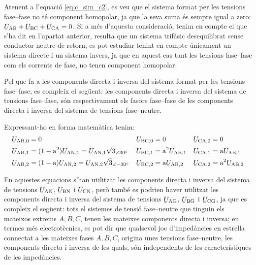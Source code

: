 Atenent a l'equació \eqref{eq:c_sim_c2}, es veu que el sistema
format per les tensions fase--fase no té component homopolar, ja que
la seva suma  és sempre igual a zero: $\cmplx{U}\ped{AB} +
\cmplx{U}\ped{BC} + \cmplx{U}\ped{CA} = 0$. Si a més
d'aquesta consideració, tenim en compte el que s'ha dit en l'apartat
anterior, resulta que un sistema trifàsic desequilibrat sense conductor
neutre de retorn, es pot estudiar tenint en compte únicament un sistema directe
i un sistema invers, ja que en aquest cas tant les tensions fase--fase com els
corrents de fase, no tenen component homopolar.

Pel que fa a les components directa i inversa del sistema format per
les tensions fase--fase, es compleix el següent: les components
directa i inversa del sistema de tensions fase--fase, són
respectivament els fasors fase--fase de les components directa i
inversa del sistema de tensions fase--neutre.

Expressant-ho en forma matemàtica tenim:
\begin{subequations}
\begin{align}
   \cmplx{U}\ped{AB,0} &= 0 &
   \cmplx{U}\ped{BC,0} &= 0 &
   \cmplx{U}\ped{CA,0} &= 0 \\
   \cmplx{U}\ped{AB,1} &= (1-\au^2) \cmplx{U}\ped{AN,1} =
   \cmplx{U}\ped{AN,1} \sqrt{3}_{\angle 30\degree} &
   \cmplx{U}\ped{BC,1} &= \au^2 \cmplx{U}\ped{AB,1} &
   \cmplx{U}\ped{CA,1} &= \au \cmplx{U}\ped{AB,1} \label{eq:c_sim_a3} \\
   \cmplx{U}\ped{AB,2} &= (1-\au) \cmplx{U}\ped{AN,2}  =
   \cmplx{U}\ped{AN,2} \sqrt{3}_{\angle -30\degree}&
   \cmplx{U}\ped{BC,2} &= \au \cmplx{U}\ped{AB,2} &
   \cmplx{U}\ped{CA,2} &= \au^2 \cmplx{U}\ped{AB,2} \label{eq:c_sim_b3}
\end{align}
\end{subequations}

En aquestes equacions s'han utilitzat les components directa i
inversa del sistema de tensions
$\cmplx{U}\ped{AN}$, $\cmplx{U}\ped{BN}$ i $\cmplx{U}\ped{CN}$,
però també es podrien haver utilitzat les components directa i
inversa del sistema de tensions
$\cmplx{U}\ped{AG}$, $\cmplx{U}\ped{BG}$ i $\cmplx{U}\ped{CG}$,
ja que es compleix el següent: tots el sistemes de tensió
fase--neutre que tinguin els mateixos extrems $A, B,
C$, tenen les mateixes components directa i inversa; en termes
més electrotècnics, es pot dir que qualsevol joc d'impedàncies en
estrella connectat a les mateixes fases $A, B, C$,
origina unes tensions fase--neutre, les components directa i inversa
de les quals, són independents de les característiques de les
impedàncies.

